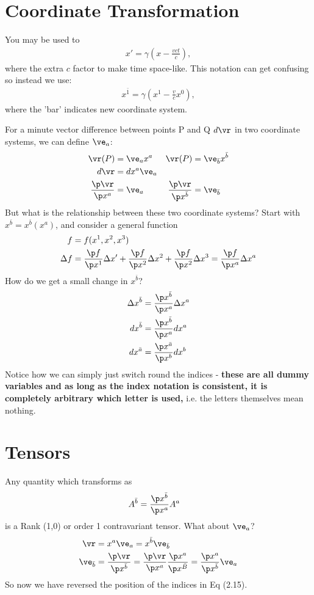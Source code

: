 \documentclass[a4paper, 11pt, normalem]{report}
\begin{document}
\section{Coordinate Transformation}
You may be used to 
\begin{align}
    x' = \gamma\left(x-\frac{vct}{c}\right),
\end{align}
where the extra $c$ factor to make time space-like. 
This notation can get confusing so instead we use:
\begin{align}
    x^{\bar{1}} = \gamma\left(x^1-\frac{v}{c}x^0\right),
\end{align}
where the 'bar' indicates new coordinate system. 

For a minute vector difference between points P and Q $d\vr$ in two coordinate systems, we can define $\ve_a$:
\begin{align}
    \vr(P) &= \ve_ax^a & \vr(P) &= \ve_{\bar{b}}x^{\bar{b}} \\
    d\vr &= dx^a\ve_a  \\
    \frac{\p\vr}{\p x^a} &= \ve_a & \frac{\p\vr}{\p x^{\bar{b}}} &= \ve_{\bar{b}}
\end{align}
But what is the relationship between these two coordinate systems?
Start with $x^{\bar{b}}=x^{\bar{b}}(x^a)$, and consider a general function 
\begin{align}
    f &= f(x^1,x^2,x^3) \\
    \Delta f &= \frac{\p f}{\p x^1}\Delta x' + \frac{\p f}{\p x^2}\Delta x^2 + \frac{\p f}{\p x^2}\Delta x^3 = \frac{\p f}{\p x^a}\Delta x^a
\end{align}
How do we get a small change in $x^{\bar{b}}$?
\begin{align}
    \Delta x^{\bar{b}} &= \frac{\p x^{\bar{b}}}{\p x^{a}}\Delta x^{a} \\
    dx^{\bar{b}} &= \frac{\p x^{\bar{b}}}{\p x^a}dx^a \\
    dx^{\bar{a}} &= \frac{\p x^{\bar{a}}}{\p x^b}dx^b
\end{align}
Notice how we can simply just switch round the indices - \textbf{these are all dummy variables and as long as the index notation is consistent, it is completely arbitrary which letter is used,} i.e. the letters themselves mean nothing.

\section{Tensors}
Any quantity which transforms as 
\begin{align}
    A^{\bar{b}} &= \frac{\p x^{\bar{b}}}{\p x^a}A^a
\end{align} 
is a Rank (1,0) or order 1 contravariant tensor.
What about $\ve_a$?
\begin{align}
    \vr &= x^a\ve_a = x^{\bar{b}}\ve_{\bar{b}} \\
    \ve_{\bar{b}} &= \frac{\p\vr}{\p x^{\bar{b}}} = \frac{\p\vr}{\p x^a} \frac{\p x^a}{\p x^{\bar{B}}} = \frac{\p x^a}{\p x^{\bar{b}}}\ve_a
\end{align}
So now we have reversed the position of the indices in Eq (2.15).
\end{document}
